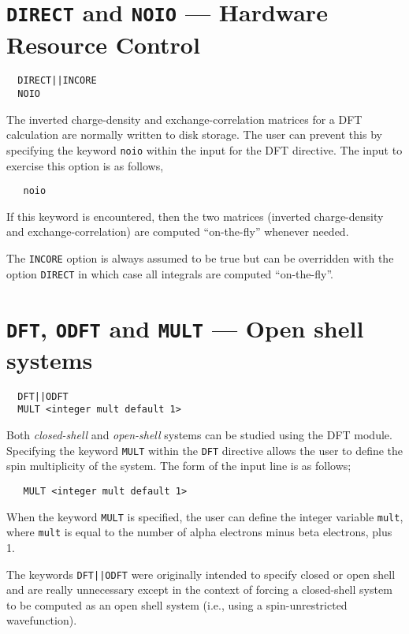 \section{{\tt DIRECT} and {\tt NOIO} --- Hardware Resource Control}
\begin{verbatim}
  DIRECT||INCORE
  NOIO
\end{verbatim}

\sloppy

The inverted charge-density and exchange-correlation matrices
for a DFT calculation are normally written to disk storage.  The user
can prevent this by specifying the keyword \verb+noio+ within the
input for the DFT directive.  The input to exercise this option is
as follows,
\begin{verbatim}
   noio
\end{verbatim}
If this keyword is encountered, then the two matrices (inverted
charge-density and exchange-correlation) are computed ``on-the-fly''
whenever needed.  

The \verb+INCORE+ option is always assumed to be true but can be
overridden with the option \verb+DIRECT+ in which case all integrals
are computed ``on-the-fly''.

\fussy

\section{{\tt DFT}, {\tt ODFT} and {\tt MULT} --- Open shell systems}
\begin{verbatim}
  DFT||ODFT
  MULT <integer mult default 1>
\end{verbatim}

Both {\sl closed-shell} and {\sl open-shell} systems can be studied using
the DFT module.  Specifying the keyword \verb+MULT+ within the \verb+DFT+
directive allows the user to define the spin multiplicity of the system.
The form of the input line is as follows;
\begin{verbatim}
   MULT <integer mult default 1> 
\end{verbatim}
When the keyword \verb+MULT+ is specified, the user can define the integer
variable \verb+mult+, where \verb+mult+ is equal to the number of alpha 
electrons minus beta electrons, plus 1.

The keywords \verb+DFT||ODFT+ were originally intended to specify
closed or open shell and are really unnecessary except in the context
of forcing a closed-shell system to be computed as an open shell
system (i.e., using a spin-unrestricted wavefunction).

